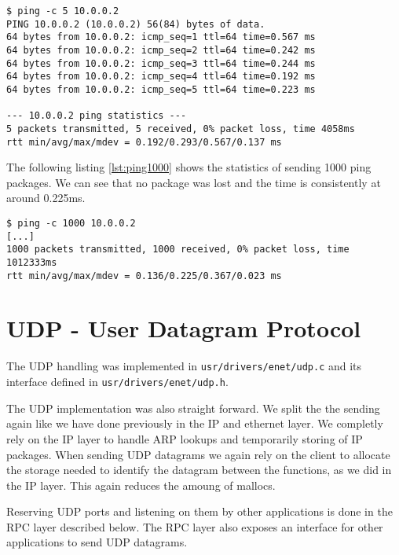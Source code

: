 \begin{lstlisting}[caption=Ping Toradex Board 5 times, label=lst:ping5]
$ ping -c 5 10.0.0.2
PING 10.0.0.2 (10.0.0.2) 56(84) bytes of data.
64 bytes from 10.0.0.2: icmp_seq=1 ttl=64 time=0.567 ms
64 bytes from 10.0.0.2: icmp_seq=2 ttl=64 time=0.242 ms
64 bytes from 10.0.0.2: icmp_seq=3 ttl=64 time=0.244 ms
64 bytes from 10.0.0.2: icmp_seq=4 ttl=64 time=0.192 ms
64 bytes from 10.0.0.2: icmp_seq=5 ttl=64 time=0.223 ms

--- 10.0.0.2 ping statistics ---
5 packets transmitted, 5 received, 0% packet loss, time 4058ms
rtt min/avg/max/mdev = 0.192/0.293/0.567/0.137 ms
\end{lstlisting}

The following listing \ref{lst:ping1000} shows the statistics of sending 1000 ping packages. We can see that no package was lost and the time is consistently at around 0.225ms.

\begin{lstlisting}[caption=Ping Toradex Board 1000 times, label=lst:ping1000]
$ ping -c 1000 10.0.0.2
[...]
1000 packets transmitted, 1000 received, 0% packet loss, time 1012333ms
rtt min/avg/max/mdev = 0.136/0.225/0.367/0.023 ms
\end{lstlisting}

\section{UDP - User Datagram Protocol}
The UDP handling was implemented in \verb|usr/drivers/enet/udp.c| and its interface defined in \verb|usr/drivers/enet/udp.h|.

The UDP implementation was also straight forward. We split the the sending again like we have done previously in the IP and ethernet layer. We completly rely on the IP layer to handle ARP lookups and temporarily storing of IP packages. When sending UDP datagrams we again rely on the client to allocate the storage needed to identify the datagram between the functions, as we did in the IP layer. This again reduces the amoung of mallocs.

Reserving UDP ports and listening on them by other applications is done in the RPC layer described below. The RPC layer also exposes an interface for other applications to send UDP datagrams.

